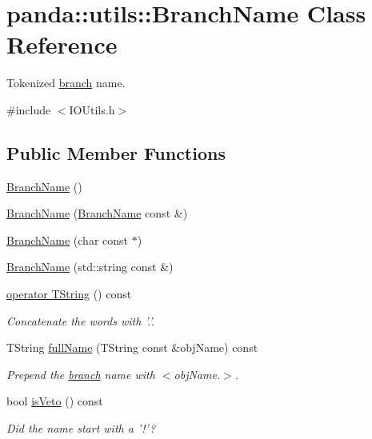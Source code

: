 \hypertarget{classpanda_1_1utils_1_1BranchName}{
\section{panda::utils::BranchName Class Reference}
\label{classpanda_1_1utils_1_1BranchName}
}


Tokenized \hyperlink{namespacepanda_1_1branch}{branch} name.  


{\ttfamily \#include $<$IOUtils.h$>$}\subsection*{Public Member Functions}
\begin{DoxyCompactItemize}
\item 
\hyperlink{classpanda_1_1utils_1_1BranchName_a3d8fc79b18dd73ecea8371172636645a}{BranchName} ()
\item 
\hyperlink{classpanda_1_1utils_1_1BranchName_a4ff9e5c6eb5053ff32fcb84d672988fa}{BranchName} (\hyperlink{classpanda_1_1utils_1_1BranchName}{BranchName} const \&)
\item 
\hyperlink{classpanda_1_1utils_1_1BranchName_ad3b6e846348eb19a2c4ff2bb371b3525}{BranchName} (char const $\ast$)
\item 
\hyperlink{classpanda_1_1utils_1_1BranchName_a8a4d8f841d091b236e16059cc6458d28}{BranchName} (std::string const \&)
\item 
\hyperlink{classpanda_1_1utils_1_1BranchName_a0de7e4b015a2ab797d121b12ba4b30bc}{operator TString} () const 
\begin{DoxyCompactList}\small\item\em Concatenate the words with '.'. \item\end{DoxyCompactList}\item 
TString \hyperlink{classpanda_1_1utils_1_1BranchName_a13958ff4a9d554d2c057c600b4f70412}{fullName} (TString const \&objName) const 
\begin{DoxyCompactList}\small\item\em Prepend the \hyperlink{namespacepanda_1_1branch}{branch} name with $<$objName.$>$. \item\end{DoxyCompactList}\item 
bool \hyperlink{classpanda_1_1utils_1_1BranchName_a7de81c2b318b47f8062ac9096a2640fc}{isVeto} () const 
\begin{DoxyCompactList}\small\item\em Did the name start with a '!'? \item\end{DoxyCompactList}\item 

\end{DoxyCompactItemize}
